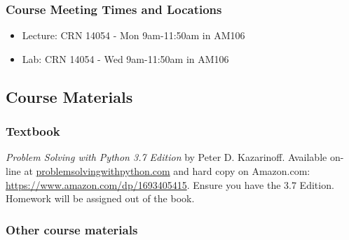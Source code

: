 \documentclass[11pt]{article}
\providecommand{\tightlist}{%
      \setlength{\itemsep}{0pt}\setlength{\parskip}{0pt}}
\begin{document}
\hypertarget{course-meeting-times-and-locations}{%
\subsubsection{Course Meeting Times and
Locations}\label{course-meeting-times-and-locations}}

\begin{itemize}
\tightlist
\item
  Lecture: CRN 14054 - Mon 9am-11:50am in AM106
\item
  Lab: CRN 14054 - Wed 9am-11:50am in AM106
\end{itemize}

\hypertarget{course-materials}{%
\subsection{Course Materials}\label{course-materials}}

\hypertarget{textbook}{%
\subsubsection{Textbook}\label{textbook}}

\emph{Problem Solving with Python 3.7 Edition} by Peter D. Kazarinoff.
Available on-line at
\href{https://problemsolvingwithpython.com/}{problemsolvingwithpython.com}
and hard copy on Amazon.com: \url{https://www.amazon.com/dp/1693405415}.
Ensure you have the 3.7 Edition. Homework will be assigned out of the
book.

\hypertarget{other-course-materials}{%
\subsubsection{Other course materials}\label{other-course-materials}}
\end{document}
